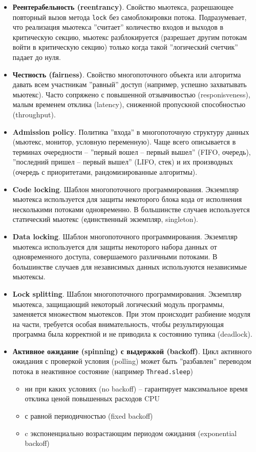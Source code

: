 \documentclass[a4paper, 12pt]{extarticle}
\begin{document}
\begin{itemize}
	\item \textbf{Реентерабельность (reentrancy)}. Свойство мьютекса, разрешающее повторный вызов метода \texttt{lock} без самоблокировки потока. Подразумевает, что реализация мьютекса ''считает'' количество входов и выходов в критическую секцию, мьютекс разблокируется (разрешает другим потокам войти в критическую секцию) только когда такой ''логический счетчик'' падает до нуля.

	\item \textbf{Честность (fairness)}. Свойство многопоточного объекта или алгоритма давать всем участникам ''равный'' доступ (например, успешно захватывать мьютекс). Часто сопряжено с повышенной отзывчивостью (responisveness), малым временем отклика (latency), сниженной пропускной способностью (throughput).

	\item \textbf{Admission policy}. Политика ''входа'' в многопоточную структуру данных (мьютекс, монитор, условную переменную).
	Чаще всего описывается в терминах очередности -- ''первый вошел -- первый вышел'' (FIFO, очередь), ''последний пришел -- первый вышел'' (LIFO, стек) и их производных (очередь с приоритетами, рандомизированные алгоритмы).

	\item \textbf{Code locking}. Шаблон многопоточного программирования. Экземпляр мьютекса используется для защиты некоторого блока кода от исполнения несколькими потоками одновременно. В большинстве случаев используется статический мьютекс (единственный экземпляр, singleton).

	\item \textbf{Data locking}. Шаблон многопоточного программирования. Экземпляр мьютекса используется для защиты некоторого набора данных от одновременного доступа, совершаемого различными потоками. В большинстве случаев для независимых данных используются независимые мьютексы.

	\item \textbf{Lock splitting}. Шаблон многопоточного программирования. Экземпляр мьютекса, защищающий некоторый логический модуль программы, заменяется множеством мьютексов. При этом происходит разбиение модуля на части, требуется особая внимательность, чтобы результирующая программа была корректной и не приводила к состоянию тупика (deadlock).

	\item \textbf{Активное ожидание (spinning) с выдержкой (backoff)}. Цикл активного ожидания с проверкой условия (polling) может быть ''разбавлен'' переводом потока в неактивное состояние (например \texttt{Thread.sleep}) 
	\begin{itemize}
		\item ни при каких условиях (no backoff) -- гарантирует максимальное время отклика ценой повышенных расходов CPU
		\item с равной периодичностью (fixed backoff)
		\item c экспоненциально возрастающим периодом ожидания (exponential backoff)
	\end{itemize}


\end{itemize}
\end{document}
